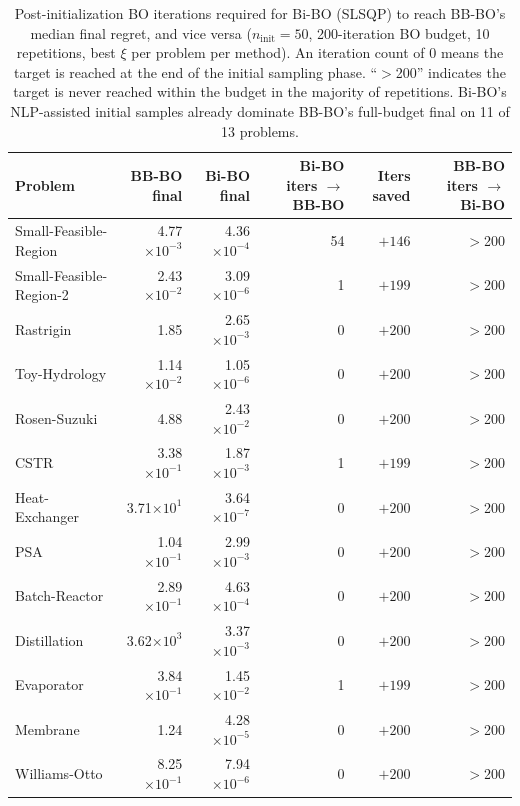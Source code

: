 \documentclass[12pt,a4paper]{article}%
\theoremstyle{plain}%
\theoremstyle{remark}%
\theoremstyle{definition}%
\providecommand{\DIFaddbegin}{} %
\newcommand{\DIFaddincludegraphics}[2][]{{\color{blue}\fbox{\DIFOincludegraphics[#1]{#2}}}} %
\DeclareRobustCommand{\DIFaddbegin}{\DIFOaddbegin \let\includegraphics\DIFaddincludegraphics} %
\begin{document}
\begin{appendices}
\DIFaddbegin \begin{table}[htbp]
\centering
\caption{Post-initialization BO iterations required for Bi-BO (SLSQP) to reach BB-BO's median final regret, and vice versa ($n_\text{init}=50$, 200-iteration BO budget, 10 repetitions, best $\xi$ per problem per method). An iteration count of $0$ means the target is reached at the end of the initial sampling phase. ``$>$200'' indicates the target is never reached within the budget in the majority of repetitions. Bi-BO's NLP-assisted initial samples already dominate BB-BO's full-budget final on 11 of 13 problems.}
\label{tab:convergence_iterations}
\begin{tabular}{@{}lrrrrr@{}}
\toprule
\textbf{Problem} & \textbf{BB-BO final} & \textbf{Bi-BO final} & \textbf{Bi-BO iters $\to$ BB-BO} & \textbf{Iters saved} & \textbf{BB-BO iters $\to$ Bi-BO} \\
\midrule
Small-Feasible-Region   & 4.77$\times 10^{-3}$ & 4.36$\times 10^{-4}$ & 54 & $+146$ & $>$200 \\
Small-Feasible-Region-2 & 2.43$\times 10^{-2}$ & 3.09$\times 10^{-6}$ & 1  & $+199$ & $>$200 \\
Rastrigin               & 1.85                 & 2.65$\times 10^{-3}$ & 0  & $+200$ & $>$200 \\
Toy-Hydrology           & 1.14$\times 10^{-2}$ & 1.05$\times 10^{-6}$ & 0  & $+200$ & $>$200 \\
Rosen-Suzuki            & 4.88                 & 2.43$\times 10^{-2}$ & 0  & $+200$ & $>$200 \\
CSTR                    & 3.38$\times 10^{-1}$ & 1.87$\times 10^{-3}$ & 1  & $+199$ & $>$200 \\
Heat-Exchanger          & 3.71$\times 10^{1}$  & 3.64$\times 10^{-7}$ & 0  & $+200$ & $>$200 \\
PSA                     & 1.04$\times 10^{-1}$ & 2.99$\times 10^{-3}$ & 0  & $+200$ & $>$200 \\
Batch-Reactor           & 2.89$\times 10^{-1}$ & 4.63$\times 10^{-4}$ & 0  & $+200$ & $>$200 \\
Distillation            & 3.62$\times 10^{3}$  & 3.37$\times 10^{-3}$ & 0  & $+200$ & $>$200 \\
Evaporator              & 3.84$\times 10^{-1}$ & 1.45$\times 10^{-2}$ & 1  & $+199$ & $>$200 \\
Membrane                & 1.24                 & 4.28$\times 10^{-5}$ & 0  & $+200$ & $>$200 \\
Williams-Otto           & 8.25$\times 10^{-1}$ & 7.94$\times 10^{-6}$ & 0  & $+200$ & $>$200 \\
\bottomrule
\end{tabular}
\end{table}


\end{appendices}
\end{document}
